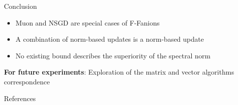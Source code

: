 \documentclass[aspectratio=169]{beamer}
\begin{document}
\begin{frame}{Conclusion}
  \begin{itemize}
    \item Muon and NSGD are special cases of F-Fanions
    \item A combination of norm-based updates is a norm-based update
    \item No existing bound describes the superiority of the spectral norm
  \end{itemize}

  \vspace{2em}
  \textbf{For future experiments}: Exploration of the matrix and vector algorithms correspondence
\end{frame}

\begin{frame}[allowframebreaks]{References}
  \printbibliography
\end{frame}
\end{document}
